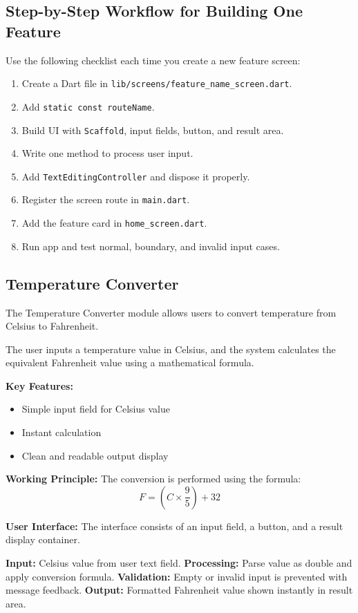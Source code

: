 \documentclass{article}
\begin{document}
\subsection{Step-by-Step Workflow for Building One Feature}
Use the following checklist each time you create a new feature screen:
\begin{enumerate}
\item Create a Dart file in \texttt{lib/screens/feature\_name\_screen.dart}.
\item Add \texttt{static const routeName}.
\item Build UI with \texttt{Scaffold}, input fields, button, and result area.
\item Write one method to process user input.
\item Add \texttt{TextEditingController} and dispose it properly.
\item Register the screen route in \texttt{main.dart}.
\item Add the feature card in \texttt{home\_screen.dart}.
\item Run app and test normal, boundary, and invalid input cases.
\end{enumerate}

\subsection{Temperature Converter}

The Temperature Converter module allows users to convert temperature from Celsius to Fahrenheit.

The user inputs a temperature value in Celsius, and the system calculates the equivalent Fahrenheit value using a mathematical formula.

\textbf{Key Features:}
\begin{itemize}
\item Simple input field for Celsius value
\item Instant calculation
\item Clean and readable output display
\end{itemize}

\textbf{Working Principle:}
The conversion is performed using the formula:
\[
F = (C \times \frac{9}{5}) + 32
\]

\textbf{User Interface:}
The interface consists of an input field, a button, and a result display container.

\begin{featurebox}
\textbf{Input:} Celsius value from user text field.\newline
\textbf{Processing:} Parse value as double and apply conversion formula.\newline
\textbf{Validation:} Empty or invalid input is prevented with message feedback.\newline
\textbf{Output:} Formatted Fahrenheit value shown instantly in result area.
\end{featurebox}
\end{document}
